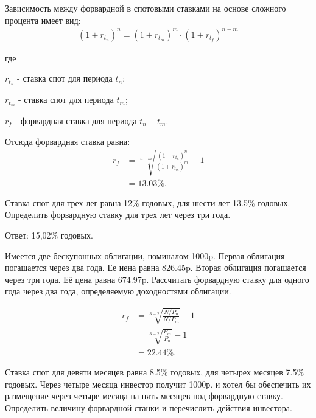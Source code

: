 \documentclass[12pt, table, a4paper,twoside]{exam}
\begin{document}
\begin{questions}
\begin{solution}[12em]
	
	\raggedright	
	Зависимость между форвардной в спотовыми ставками на основе сложного процента имеет вид:
	\begin{align}
	(1+r_{t_n})^n=(1+r_{t_m})^m \cdot (1+r_{t_f})^{n-m}
	\end{align}

	\raggedright
	где
	
	$r_{t_n}$ - ставка спот для периода $t_n$;
	
	$r_{t_m}$ - ставка спот для периода $t_m$;
	
	$r_f$ - форвардная ставка для периода $t_n - t_m$.
	
	Отсюда форвардная ставка равна:
	\begin{align}
		r_f &= \sqrt[n-m]{\frac{(1+r_{t_n})^n}{(1+r_{t_m})^m}} - 1\\
		&=13.03\%.\nonumber
	\end{align}
\end{solution}



\question[10] Ставка спот для трех лег равна 12\% годовых, для шести лет 13.5\% годовых. Определить форвардную ставку для трех лет через три года.

\begin{solution}[12em]
	
	\raggedright
	Ответ: 15,02\% годовых.
\end{solution}



\question[10] Имеется две бескупонных облигации, номиналом 1000p. Первая облигация погашается через два года. Ее иена равна 826.45p. Вторая облигация погашается через три года. Её цена равна 674.97p. Рассчитать форвардную ставку для одного года через два года, определяемую доходностями облигации.

\begin{solution}[12em]
	\begin{align}
	r_f&=\sqrt[3-2]{\frac{N/P_n}{N/P_m}}-1\nonumber\\
	&=\sqrt[3-2]{\frac{P_m}{P_n}}-1\\
	&=22.44\%.\nonumber
	\end{align}
\end{solution}


\question[10] Ставка спот для девяти месяцев равна 8.5\% годовых, для четырех месяцев 7.5\% годовых. Через четыре месяца инвестор получит 1000р. и хотел бы обеспечить их размещение через четыре месяца на пять месяцев под форвардную ставку. Определить величину форвардной станки и перечислить действия инвестора.


\end{questions}
\end{document}
